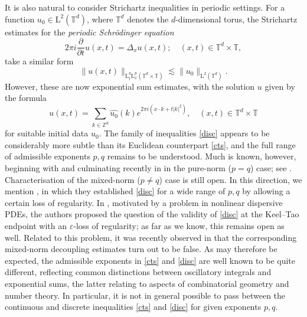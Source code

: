 \documentclass[10pt,a4paper]{amsart}
\numberwithin{equation}{section}
\begin{document}
It is also natural to consider Strichartz inequalities in periodic settings. For a function $u_0\in \mathrm{L}^2(\mathbb{T}^d)$, where $\mathbb{T}^d$ denotes the $d$-dimensional torus, the Strichartz estimates for the \textit{periodic Schr\"{o}dinger equation}
\begin{equation*}%
2\pi i\frac{\partial}{\partial t} u(x,t) = \Delta_x u(x,t); \quad (x,t)\in\mathbb{T}^d\times \mathbb{T},
\end{equation*}
take a similar form
\begin{equation}\label{disc}
\|u(x,t)\|_{\mathrm{L}^q_t\mathrm{L}^p_x(\mathbb{T}^d\times\mathbb{T})}\lesssim\|u_0\|_{\mathrm{L}^2(\mathbb{T}^d)}.
\end{equation}
However, these are now exponential sum estimates, with
the solution $u$ given by the formula
\begin{equation}\label{eq:per-solution}
u(x,t)=\sum_{k\in\mathbb{Z}^d}\widehat{u_0}(k)e^{2\pi i(x\cdot k+t|k|^2)},
\quad (x,t)\in\mathbb{T}^d\times\mathbb{T}
\end{equation}
for suitable initial data $u_0$.
The family of inequalities \eqref{disc} appears to be considerably more subtle than its Euclidean counterpart \eqref{cts}, and the full range of admissible exponents $p,q$ remains to be understood.
Much is known, however, beginning with \cite{B1} and culminating recently in \cite{BD} in the pure-norm ($p=q$) case; see \cite{Dem,Nah}.
Characterisation of the mixed-norm ($p\neq q$) case is still open. In this direction, we mention \cite{BGT}, in which they established \eqref{disc} for a wide range of $p,q$ by allowing a certain loss of regularity. In \cite{KNS}, motivated by a problem in nonlinear dispersive PDEs, the authors proposed the question of the validity of \eqref{disc} at the Keel--Tao endpoint with an $\varepsilon$-loss of regularity; as far as we know, this remains open as well.
Related to this problem, it was recently observed in \cite{DJLM} that the corresponding mixed-norm decoupling estimates turn out to be false. 
As may therefore be expected, the admissible exponents in \eqref{cts} and \eqref{disc} are well known to be quite different, reflecting common distinctions between oscillatory integrals and exponential sums, the latter relating to aspects of combinatorial geometry and number theory. In particular, it is not in general possible to pass between the continuous and discrete inequalities \eqref{cts} and \eqref{disc} for given exponents $p,q$. 
\end{document}
